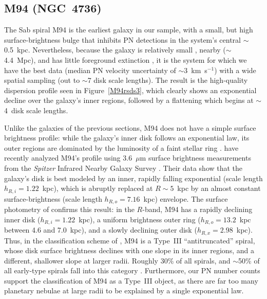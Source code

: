 \documentclass[12pt,preprint]{emulateapj}
\newcommand{\kms}{km~s$^{-1}$}
\begin{document}
\subsection{M94 (NGC~4736)}
The Sab spiral M94 is the earliest galaxy in our sample, with a small, but high surface-brightness bulge that inhibits PN detections in the system's central $\sim$0.5~kpc.  Nevertheless, because the galaxy is relatively small \citep[$h_R = 1.22$~kpc;][]{g+09,dB+08}, nearby ($\sim$4.4~Mpc), and has little foreground extinction \citep[$E(B-V) = 0.018$;][]{sfd98}, it is the system for which we have the best data (median PN velocity uncertainty of $\sim$3~\kms) with a wide spatial sampling (out to $\sim$7 disk scale lengths).  The result is the high-quality dispersion profile seen in Figure~\ref{M94rsds3}, which clearly shows an exponential decline over the galaxy's inner regions, followed by a flattening which begins at $\sim$4~disk scale lengths.

Unlike the galaxies of the previous sections, M94 does not have a simple surface brightness profile:  while the galaxy's inner disk follows an exponential law, its outer regions are dominated by the luminosity of a faint stellar ring \citep{s61, ss76}.   have recently analyzed M94's profile using 3.6~$\mu$m surface brightness measurements from the {\sl Spitzer\/} Infrared Nearby Galaxy Survey \citep[SINGS;][]{SINGS}.   Their data show that the galaxy's disk is best modeled by an inner, rapidly falling exponential (scale length $h_{R,i} = 1.22$~kpc), which is abruptly replaced at $R \sim 5$~kpc by an almost constant surface-brightness (scale length $h_{R,o} = 7.16$~kpc) envelope.   The surface photometry of \citet{g+09} confirms this result:  in the $R$-band, M94 has a rapidly declining inner disk  ($h_{R,i} = 1.22$~kpc), a uniform brightness outer ring ($h_{R,o} = 13.2$~kpc between 4.6 and 7.0~kpc), and a slowly declining outer disk ($h_{R,x} = 2.98$~kpc).  Thus,  in the classification scheme of \citet{e+05}, M94 is a Type~III ``antitruncated'' spiral, whose disk surface brightness declines with one slope in its inner regions, and a different, shallower slope at larger radii.   Roughly 30\% of all spirals, and $\sim$50\% of all early-type spirals fall into this category \citep{p+08}.  Furthermore, our PN number counts support the classification of M94 as a Type~III object, as there are far too many planetary nebulae at large radii to be explained by a single exponential law.
  
\end{document}
